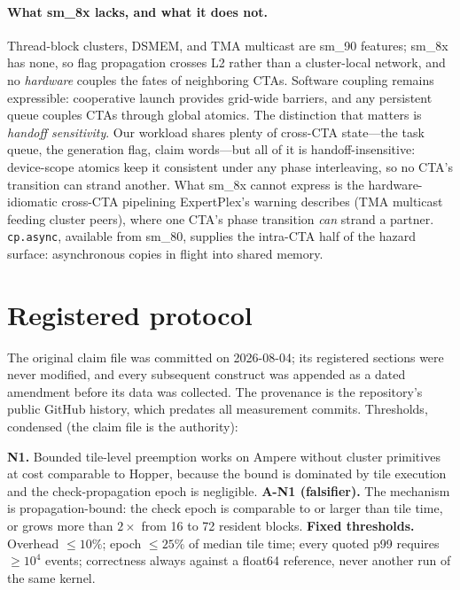 \documentclass[11pt]{article}
\begin{document}
\paragraph{What sm\_8x lacks, and what it does not.} Thread-block
clusters, DSMEM, and TMA multicast are sm\_90 features; sm\_8x has
none, so flag propagation crosses L2 rather than a cluster-local
network, and no \emph{hardware} couples the fates of neighboring
CTAs. Software coupling remains expressible: cooperative launch
provides grid-wide barriers, and any persistent queue couples CTAs
through global atomics. The distinction that matters is
\emph{handoff sensitivity}. Our workload shares plenty of cross-CTA
state---the task queue, the generation flag, claim words---but all of
it is handoff-insensitive: device-scope atomics keep it consistent
under any phase interleaving, so no CTA's transition can strand
another. What sm\_8x cannot express is the hardware-idiomatic
cross-CTA pipelining ExpertPlex's warning describes (TMA multicast
feeding cluster peers), where one CTA's phase transition \emph{can}
strand a partner. \texttt{cp.async}, available from sm\_80, supplies
the intra-CTA half of the hazard surface: asynchronous copies in
flight into shared memory.

\section{Registered protocol}
\label{sec:protocol}

The original claim file was committed on 2026-08-04; its registered
sections were never modified, and every subsequent construct was
appended as a dated amendment before its data was collected. The
provenance is the repository's public GitHub history, which predates
all measurement commits. Thresholds, condensed (the claim file is the
authority):

\textbf{N1.} Bounded tile-level preemption works on Ampere without
cluster primitives at cost comparable to Hopper, because the bound is
dominated by tile execution and the check-propagation epoch is
negligible. \textbf{A-N1 (falsifier).} The mechanism is
propagation-bound: the check epoch is comparable to or larger than
tile time, or grows more than $2\times$ from 16 to 72 resident
blocks. \textbf{Fixed thresholds.} Overhead ${\le}10\%$; epoch
${\le}25\%$ of median tile time; every quoted p99 requires
${\ge}10^4$ events; correctness always against a float64 reference,
never another run of the same kernel.
\end{document}
